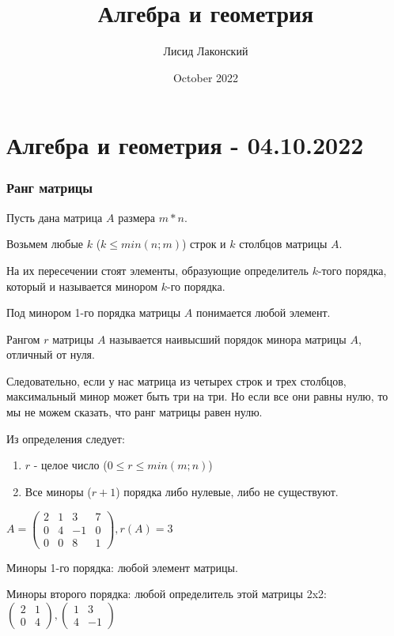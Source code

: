 \documentclass{article}
\title{Алгебра и геометрия}
\author{Лисид Лаконский}
\date{October 2022}
\begin{document}
\maketitle

\tableofcontents
\pagebreak


\section{Алгебра и геометрия - 04.10.2022}

\subsubsection{Ранг матрицы}

Пусть дана матрица $A$ размера $m * n$.

Возьмем любые $k$ ($k \le min(n;m)$) строк и $k$ столбцов матрицы $A$.

На их пересечении стоят элементы, образующие определитель $k$-того порядка, который и называется минором $k$-го порядка.

Под минором 1-го порядка матрицы $A$ понимается любой элемент.

Рангом $r$ матрицы $A$ называется наивысший порядок минора матрицы $A$, отличный от нуля.

Следовательно, если у нас матрица из четырех строк и трех столбцов, максимальный минор может быть три на три. Но если все они равны нулю, то мы не можем сказать, что ранг матрицы равен нулю.

Из определения следует:

\begin{enumerate}
    \item $r$ - целое число ($0 \le r \le min(m;n)$)
    \item Все миноры ($r + 1$) порядка либо нулевые, либо не существуют. 
\end{enumerate}

$A = \begin{pmatrix}
    2 & 1 & 3 & 7 \\
    0 & 4 & -1 & 0 \\
    0 & 0 & 8 & 1
\end{pmatrix}, r(A) = 3$

Миноры 1-го порядка: любой элемент матрицы. 

Миноры второго порядка: любой определитель этой матрицы 2x2: $\begin{pmatrix} 2 & 1 \\ 0 & 4 \end{pmatrix}, \begin{pmatrix} 1 & 3 \\ 4 & -1 \end{pmatrix}$
\end{document}
